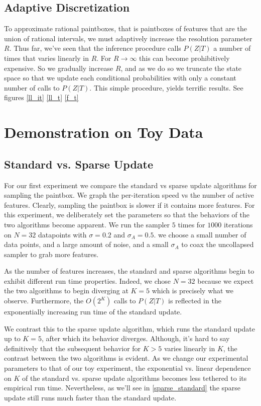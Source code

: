 \documentclass{article}
\begin{document}
\subsection{Adaptive Discretization} \label{R}
To approximate rational paintboxes, that is paintboxes of features that are the union of rational intervals, we must adaptively increase the resolution parameter $R$.  Thus far, we've seen that the inference procedure calls $P(Z|T)$ a number of times that varies linearly in $R$.  For $R \rightarrow \infty$ this can become prohibitively expensive.  So we gradually increase $R$, and as we do so we truncate the state space so that we update each conditional probabilities with only a constant number of calls to $P(Z|T)$.  This simple procedure, yields terrific results.  See figures \ref{ll_it} \ref{ll_t} \ref{f_t}


\section{Demonstration on Toy Data}\label{results}

\subsection{Standard vs. Sparse Update}

For our first experiment we compare the standard vs sparse update algorithms for sampling the paintbox.  We graph the per-iteration speed vs the number of active features.  Clearly, sampling the paintbox is slower if it contains more features.  For this experiment, we deliberately set the parameters so that the behaviors of the two algorithms become apparent.  We run the sampler $5$ times for $1000$ iterations on $N = 32$ datapoints with $\sigma = 0.2$ and $\sigma_A = 0.5$.  we choose a small number of data points, and a large amount of noise, and a small $\sigma_A$ to coax the uncollapsed sampler to grab more features. 

As the number of features increases, the standard and sparse algorithms begin to exhibit different run time properties.  Indeed, we chose $N=32$ because we expect the two algorithms to begin diverging at $K = 5$ which is precisely what we observe.  Furthermore, the $O(2^K)$ calls to $P(Z|T)$ is reflected in the exponentially increasing run time of the standard update.

We contrast this to the sparse update algorithm, which runs the standard update up to $K=5$, after which its behavior diverges.  Although, it's hard to say definitively that the subsequent behavior for $K > 5$ varies linearly in $K$, the contrast between the two algorithms is evident.  As we change our experimental parameters to that of our toy experiment, the exponential vs. linear dependence on $K$ of the standard vs. sparse update algorithms becomes less tethered to its empirical run time.  Nevertheless, as we'll see in \ref{sparse_standard} the sparse update still runs much faster than the standard update.  
\end{document}
